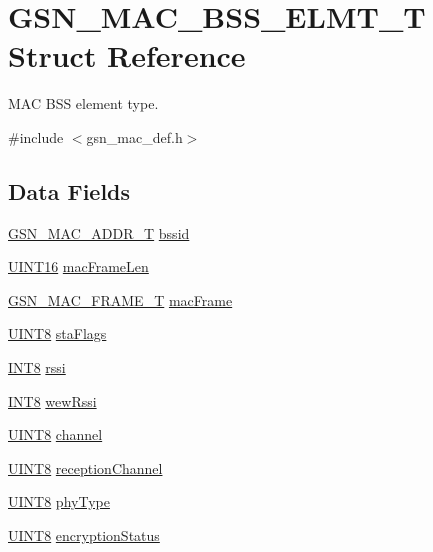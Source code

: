 \hypertarget{a00110}{
\section{GSN\_\-MAC\_\-BSS\_\-ELMT\_\-T Struct Reference}
\label{a00110}
}


MAC BSS element type.  




{\ttfamily \#include $<$gsn\_\-mac\_\-def.h$>$}

\subsection*{Data Fields}
\begin{DoxyCompactItemize}
\item 
\hyperlink{a00416}{GSN\_\-MAC\_\-ADDR\_\-T} \hyperlink{a00110_a0c8072b3bb52f68906a0aacd382de7c2}{bssid}
\item 
\hyperlink{a00660_ga09f1a1fb2293e33483cc8d44aefb1eb1}{UINT16} \hyperlink{a00110_ac3acb956519f881e356ab23af1a6aa07}{macFrameLen}
\item 
\hyperlink{a00116}{GSN\_\-MAC\_\-FRAME\_\-T} \hyperlink{a00110_a0a3d7bf8e6b1539749ee8032ddd7af80}{macFrame}
\item 
\hyperlink{a00660_gab27e9918b538ce9d8ca692479b375b6a}{UINT8} \hyperlink{a00110_a962a0679bf5d12791a659dfbc547a894}{staFlags}
\item 
\hyperlink{a00660_ga307b8734c020247f6bac4fcde0dcfbb9}{INT8} \hyperlink{a00110_a1655ee4c98e91aaf1c7714c22f3a2fcd}{rssi}
\item 
\hyperlink{a00660_ga307b8734c020247f6bac4fcde0dcfbb9}{INT8} \hyperlink{a00110_a5d16853ddf4470888459d45288b82ff9}{wewRssi}
\item 
\hyperlink{a00660_gab27e9918b538ce9d8ca692479b375b6a}{UINT8} \hyperlink{a00110_a52d69a3bd7bdfdfc6f9e40f4962c575d}{channel}
\item 
\hyperlink{a00660_gab27e9918b538ce9d8ca692479b375b6a}{UINT8} \hyperlink{a00110_a12d3c6638df41c42f00fc435666a4dda}{receptionChannel}
\item 
\hyperlink{a00660_gab27e9918b538ce9d8ca692479b375b6a}{UINT8} \hyperlink{a00110_af9a21f0a566cd662139f84bfaf75d662}{phyType}
\item 
\hyperlink{a00660_gab27e9918b538ce9d8ca692479b375b6a}{UINT8} \hyperlink{a00110_a90e79645daccb077a9e5395b430296c7}{encryptionStatus}
\end{DoxyCompactItemize}


